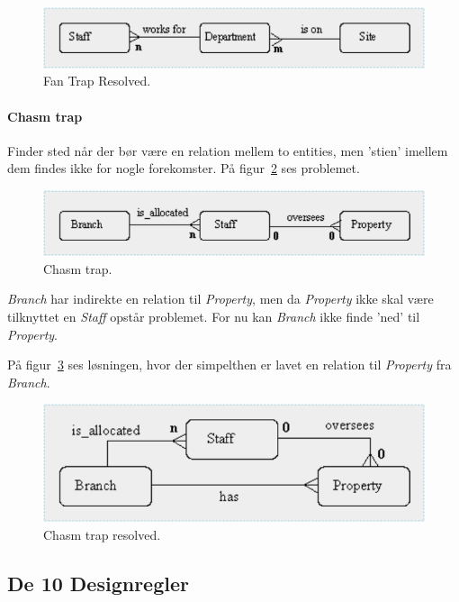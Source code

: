 \begin{figure}[h]
\centering
\includegraphics[width=0.8\linewidth]{figs/spm2/fan_solved}
\caption{Fan Trap Resolved.}
\label{fig:fan_solved}
\end{figure}

\paragraph{Chasm trap} 

Finder sted når der bør være en relation mellem to entities, men 'stien' imellem dem findes ikke for nogle forekomster. På figur~\ref{fig:chasm} ses problemet.

\begin{figure}[H]
\centering
\includegraphics[width=0.75\linewidth]{figs/spm2/chasm}
\caption{Chasm trap.}
\label{fig:chasm}
\end{figure}

\textit{Branch} har indirekte en relation til \textit{Property}, men da \textit{Property} ikke skal være tilknyttet en \textit{Staff} opstår problemet. For nu kan \textit{Branch} ikke finde 'ned' til \textit{Property}.

På figur~\ref{fig:chasm_solved} ses løsningen, hvor der simpelthen er lavet en relation til \textit{Property} fra \textit{Branch}.

\begin{figure}[H]
\centering
\includegraphics[width=0.7\linewidth]{figs/spm2/chasm_solved}
\caption{Chasm trap resolved.}
\label{fig:chasm_solved}
\end{figure}


\subsection{De 10 Designregler}

